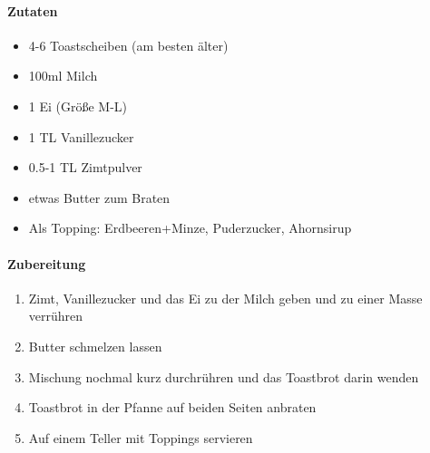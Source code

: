\newpage
{}
\paragraph{Zutaten}
\begin{itemize}[noitemsep]
	\item 4-6 Toastscheiben (am besten älter)
	\item 100ml Milch
	\item 1 Ei (Größe M-L)
	\item 1 TL Vanillezucker
	\item 0.5-1 TL Zimtpulver
	\item etwas Butter zum Braten
	\item Als Topping: Erdbeeren+Minze, Puderzucker, Ahornsirup
\end{itemize}
\paragraph{Zubereitung}
\begin{enumerate}[noitemsep]
	\item Zimt, Vanillezucker und das Ei zu der Milch geben und zu einer Masse verrühren
	\item Butter schmelzen lassen
	\item Mischung nochmal kurz durchrühren und das Toastbrot darin wenden
	\item Toastbrot in der Pfanne auf beiden Seiten anbraten
	\item Auf einem Teller mit Toppings servieren
\end{enumerate}
